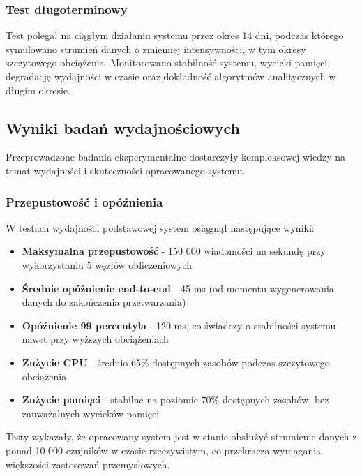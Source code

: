 \subsubsection{Test długoterminowy}
\label{subsubsec:test_dlugoterminowy}

Test polegał na ciągłym działaniu systemu przez okres 14 dni, podczas którego symulowano strumień danych o zmiennej intensywności, w tym okresy szczytowego obciążenia. Monitorowano stabilność systemu, wycieki pamięci, degradację wydajności w czasie oraz dokładność algorytmów analitycznych w długim okresie.

\subsection{Wyniki badań wydajnościowych}
\label{subsec:wyniki_badan}

Przeprowadzone badania eksperymentalne dostarczyły kompleksowej wiedzy na temat wydajności i skuteczności opracowanego systemu.

\subsubsection{Przepustowość i opóźnienia}
\label{subsubsec:przepustowosc}

W testach wydajności podstawowej system osiągnął następujące wyniki:

\begin{itemize}
    \item \textbf{Maksymalna przepustowość} - 150 000 wiadomości na sekundę przy wykorzystaniu 5 węzłów obliczeniowych
    \item \textbf{Średnie opóźnienie end-to-end} - 45 ms (od momentu wygenerowania danych do zakończenia przetwarzania)
    \item \textbf{Opóźnienie 99 percentyla} - 120 ms, co świadczy o stabilności systemu nawet przy wyższych obciążeniach
    \item \textbf{Zużycie CPU} - średnio 65\% dostępnych zasobów podczas szczytowego obciążenia
    \item \textbf{Zużycie pamięci} - stabilne na poziomie 70\% dostępnych zasobów, bez zauważalnych wycieków pamięci
\end{itemize}

Testy wykazały, że opracowany system jest w stanie obsłużyć strumienie danych z ponad 10 000 czujników w czasie rzeczywistym, co przekracza wymagania większości zastosowań przemysłowych.

